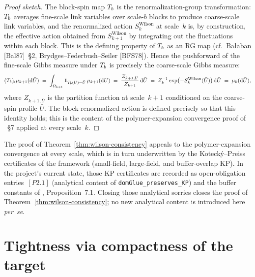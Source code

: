 \begin{proof}[Proof sketch]
The block-spin map $T_b$ is the renormalization-group transformation:
$T_b$ averages fine-scale link variables over scale-$b$ blocks to
produce coarse-scale link variables, and the renormalized action
$S_k^{\mathrm{Wilson}}$ at scale~$k$ is, by construction, the effective
action obtained from $S_{k+1}^{\mathrm{Wilson}}$ by integrating out
the fluctuations within each block.  This is the defining property of
$T_b$ as an RG map (cf.\ Bałaban [Bal87]~\S2, Brydges--Federbush--Seiler
[BFS78]).  Hence the pushforward of the fine-scale Gibbs measure under
$T_b$ is precisely the coarse-scale Gibbs measure:
\begin{equation*}
  (T_b)_{\!*} \mu_{k+1}(\mathrm{d}\bar U)
  \;=\;
  \int_{\Omega_{k+1}} \mathbf{1}_{T_b(U) = \bar U} \, \mu_{k+1}(\mathrm{d}U)
  \;=\;
  \frac{Z_{k+1, \bar U}}{Z_{k+1}} \, \mathrm{d}\bar U
  \;=\;
  Z_k^{-1} \exp\bigl(-S_k^{\mathrm{Wilson}}(\bar U)\bigr) \, \mathrm{d}\bar U
  \;=\;
  \mu_k(\mathrm{d}\bar U),
\end{equation*}
where $Z_{k+1, \bar U}$ is the partition function at scale~$k+1$
conditioned on the coarse-spin profile $\bar U$.  The block-renormalized
action is defined precisely so that this identity holds; this is the
content of the polymer-expansion convergence proof of
~\S7 applied at every scale~$k$.
\end{proof}

\begin{remark}
\label{rem:where-analysis}
The proof of Theorem~\ref{thm:wilson-consistency} appeals to the
polymer-expansion convergence at every scale, which is in turn
underwritten by the Kotecký--Preiss certificates of the
framework (small-field, large-field, and
buffer-overlap KP).  In the project's current state, those KP
certificates are recorded as
open-obligation entries~$[P2.1]$ (analytical content
of \texttt{domGlue\_preserves\_KP}) and the buffer constants of
, Proposition~7.1.  Closing those
analytical sorries closes the proof of
Theorem~\ref{thm:wilson-consistency}; no new analytical content is
introduced here \emph{per~se}.
\end{remark}

\section{Tightness via compactness of the target}
\label{sec:tightness}

